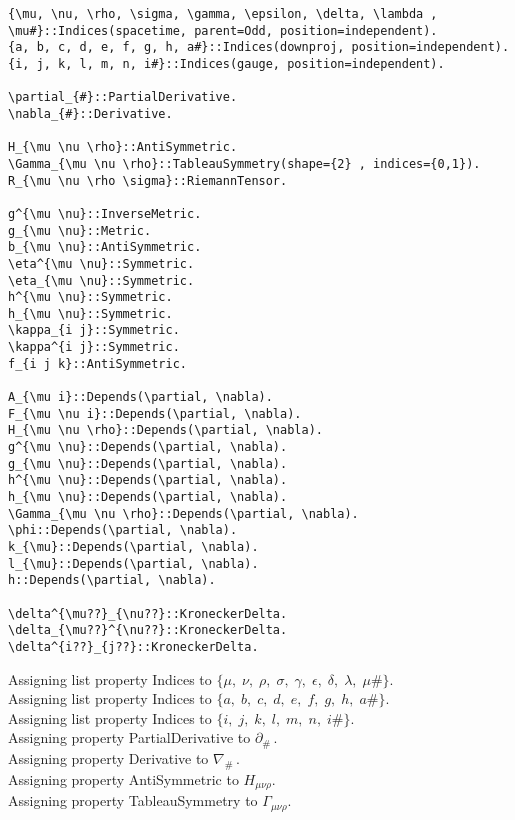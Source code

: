 \documentclass[11pt]{article}
\begin{document}
{\color[named]{Blue}\begin{verbatim}
{\mu, \nu, \rho, \sigma, \gamma, \epsilon, \delta, \lambda , \mu#}::Indices(spacetime, parent=Odd, position=independent).
{a, b, c, d, e, f, g, h, a#}::Indices(downproj, position=independent).
{i, j, k, l, m, n, i#}::Indices(gauge, position=independent).

\partial_{#}::PartialDerivative.
\nabla_{#}::Derivative.

H_{\mu \nu \rho}::AntiSymmetric.
\Gamma_{\mu \nu \rho}::TableauSymmetry(shape={2} , indices={0,1}).
R_{\mu \nu \rho \sigma}::RiemannTensor.

g^{\mu \nu}::InverseMetric.
g_{\mu \nu}::Metric.
b_{\mu \nu}::AntiSymmetric.
\eta^{\mu \nu}::Symmetric.
\eta_{\mu \nu}::Symmetric.
h^{\mu \nu}::Symmetric.
h_{\mu \nu}::Symmetric.
\kappa_{i j}::Symmetric.
\kappa^{i j}::Symmetric.
f_{i j k}::AntiSymmetric.

A_{\mu i}::Depends(\partial, \nabla).
F_{\mu \nu i}::Depends(\partial, \nabla).
H_{\mu \nu \rho}::Depends(\partial, \nabla).
g^{\mu \nu}::Depends(\partial, \nabla).
g_{\mu \nu}::Depends(\partial, \nabla).
h^{\mu \nu}::Depends(\partial, \nabla).
h_{\mu \nu}::Depends(\partial, \nabla).
\Gamma_{\mu \nu \rho}::Depends(\partial, \nabla).
\phi::Depends(\partial, \nabla).
k_{\mu}::Depends(\partial, \nabla).
l_{\mu}::Depends(\partial, \nabla).
h::Depends(\partial, \nabla).

\delta^{\mu??}_{\nu??}::KroneckerDelta.
\delta_{\mu??}^{\nu??}::KroneckerDelta.
\delta^{i??}_{j??}::KroneckerDelta.
\end{verbatim}}
Assigning list property Indices to $\{\mu,\; \nu,\; \rho,\; \sigma,\; \gamma,\; \epsilon,\; \delta,\; \lambda,\; \mu\#\}$.
\\
Assigning list property Indices to $\{a,\; b,\; c,\; d,\; e,\; f,\; g,\; h,\; a\#\}$.
\\
Assigning list property Indices to $\{i,\; j,\; k,\; l,\; m,\; n,\; i\#\}$.
\\
Assigning property PartialDerivative to ${\partial}_{\#}\, $.
\\
Assigning property Derivative to ${\nabla}_{\#}\, $.
\\
Assigning property AntiSymmetric to ${H}_{\mu \nu \rho}$.
\\
Assigning property TableauSymmetry to ${\Gamma}_{\mu \nu \rho}$.
\end{document}
